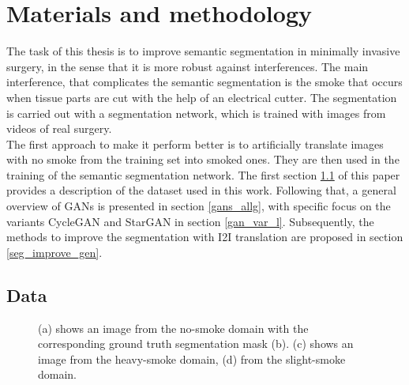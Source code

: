
\chapter{Materials and methodology}\label{method}
The task of this thesis is to improve semantic segmentation in minimally invasive surgery, in the sense that it is more robust against interferences.
The main interference, that complicates the semantic segmentation is the smoke that occurs when tissue parts are cut with the help of an electrical cutter.
The segmentation is carried out with a segmentation network, which is trained with images from videos of real surgery.\\
The first approach to make it perform better is to artificially translate images with no smoke from the training set into smoked ones.
They are then used in the training of the semantic segmentation network.
The first section \ref{data_pres} of this paper provides a description of the dataset used in this work.
Following that, a general overview of GANs is presented in section \ref{gans_allg}, with specific focus on the variants CycleGAN and StarGAN in section \ref{gan_var_l}. 
Subsequently, the methods to improve the segmentation with I2I translation are proposed in section \ref{seg_improve_gen}.
\section{Data}\label{data_pres}
\begin{figure}[h]
    \centering
    \hfill
    
    \vspace{1cm}
    
    \hfill
    
    \caption[Display of data]{(a) shows an image from the no-smoke domain with the corresponding ground truth segmentation mask (b). 
    (c) shows an image from the heavy-smoke domain, (d) from the slight-smoke domain.}
    \label{example_imgs}
\end{figure}

